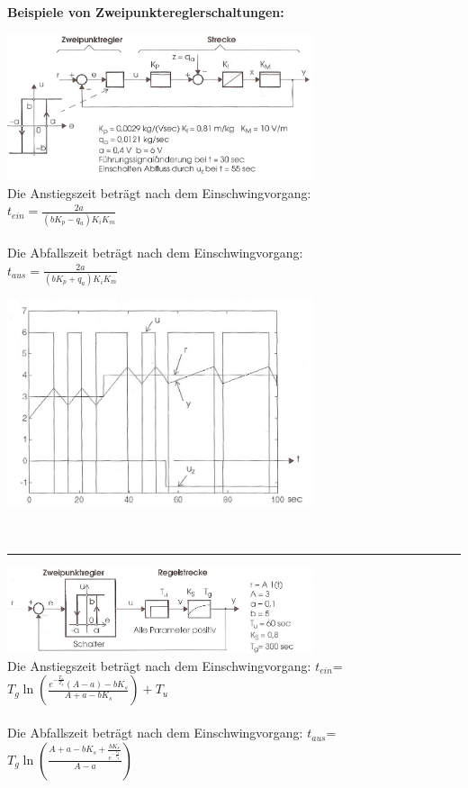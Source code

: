 		\textbf{Beispiele von Zweipunktereglerschaltungen:}\\
		\begin{minipage}{9cm}
			\vspace{.5cm}        
	 		\includegraphics[width=9cm]{./bilder/Zweipunktregler-b+b2.jpg}\\
			Die Anstiegszeit beträgt nach dem Einschwingvorgang:\\
			$t_{ein}=\frac{2a}{(b K_p - q_a)K_i K_m}$ \\ \\
			Die Abfallszeit beträgt nach dem Einschwingvorgang:\\
			$t_{aus}=\frac{2a}{(b K_p + q_a)K_i K_m}$
        \end{minipage}
		\begin{minipage}{9cm}
			\vspace{.5cm}        
			\includegraphics[width=9cm]{./bilder/Zweipunktregler-b+b_dia.jpg}
        \end{minipage}\\
	\vspace{.5cm}
	\hrule
	\vspace{.5cm}
		\begin{minipage}{9cm}
 		\includegraphics[width=9cm]{./bilder/ZweipunktreglerTotglied2.jpg}\\
			Die Anstiegszeit beträgt nach dem Einschwingvorgang:
			$t_{ein}$=$T_g\ln(\frac{e^{-\frac{T_u}{T_g}}(A-a)-b K_s}{A+a-b K_s})+T_u$\\ \\
			Die Abfallszeit beträgt nach dem Einschwingvorgang:
			$t_{aus}$=$T_g\ln(\frac{A+a-b
			K_s+\frac{b K_s}{e^{-\frac{T_u}{T_g}}}}{A-a})$\\
        \end{minipage}
